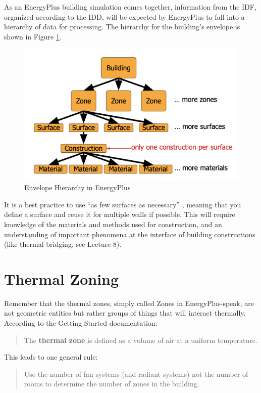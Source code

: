 \documentclass[10pt]{article}
\begin{document}
As an EnergyPlus building simulation comes together, information from the IDF, organized according to the IDD, will be expected by EnergyPlus to fall into a hierarchy of data for processing. The hierarchy for the building's envelope is shown in Figure \ref{hierarchy}.

\begin{figure}[h]
\centering
\includegraphics[width=4.5in]{extras12/envelopehierarchy.png}
\caption{Envelope Hierarchy in EnergyPlus \cite{EPcourseteaching}}
\label{hierarchy}
\end{figure}

It is a best practice to use ``as few surfaces as necessary'' \cite{EPcourseteaching}, meaning that you define a surface and reuse it for multiple walls if possible. This will require knowledge of the materials and methods used for construction, and an understanding of important phenomena at the interface of building constructions (like thermal bridging, see Lecture 8).

\section{Thermal Zoning}

Remember that the thermal zones, simply called Zones in EnergyPlus-speak, are not geometric entities but rather groups of things that will interact thermally. According to the Getting Started documentation:

\begin{quote}
    The \textbf{thermal zone} is defined as a volume of air at a uniform temperature. \cite{EPdocs9gettingstarted}
\end{quote} 

This leads to one general rule: 

\begin{quote}
Use the number of fan systems (and radiant systems) not the number of rooms to determine the
number of zones in the building. \cite{EPdocs9gettingstarted}
\end{quote}
\end{document}

